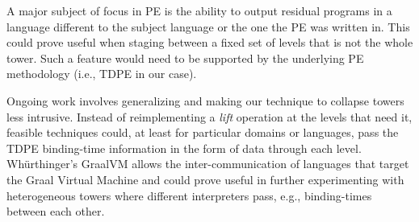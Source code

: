 \documentclass[a4paper,12pt,twoside,openright]{report}
\theoremstyle{definition}
\begin{document}
A major subject of focus in PE is the ability to output residual programs in a language different to the subject language or the one the PE was written in. This could prove useful when staging between a fixed set of levels that is not the whole tower. Such a feature would need to be supported by the underlying PE methodology (i.e., TDPE in our case).

Ongoing work involves generalizing and making our technique to collapse towers less intrusive. Instead of reimplementing a \textit{lift} operation at the levels that need it, feasible techniques could, at least for particular domains or languages, pass the TDPE binding-time information in the form of data through each level. Wh{\"u}rthinger's GraalVM \cite{wurthinger2013one} allows the inter-communication of languages that target the Graal Virtual Machine and could prove useful in further experimenting with heterogeneous towers where different interpreters pass, e.g., binding-times between each other.
\end{document}
